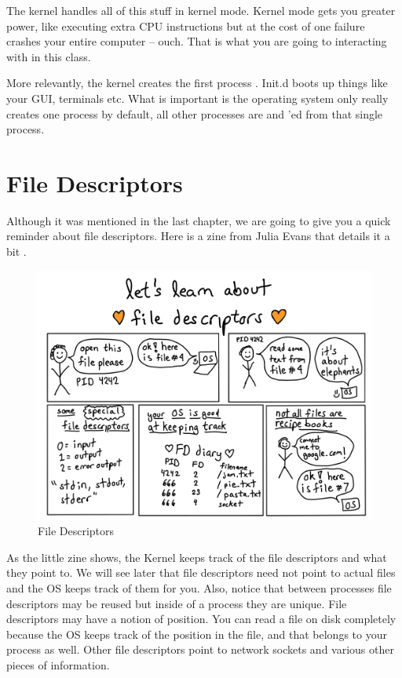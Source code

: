 The kernel handles all of this stuff in kernel mode.
Kernel mode gets you greater power, like executing extra CPU instructions but at the cost of one failure crashes your entire computer -- ouch.
That is what you are going to interacting with in this class.

More relevantly, the kernel creates the first process . Init.d boots up things like your GUI, terminals etc.
What is important is the operating system only really creates one process by default, all other processes are  and 'ed from that single process.

\section{File Descriptors}

Although it was mentioned in the last chapter, we are going to give you a quick reminder about file descriptors.
Here is a zine from Julia Evans that details it a bit \cite{evans_2018}.

\begin{figure}[htbp]
  \centering
  \includegraphics[width=.8\textwidth]{processes/images/file-descriptors.png}
  \caption{File Descriptors}
\end{figure}

As the little zine shows, the Kernel keeps track of the file descriptors and what they point to.
We will see later that file descriptors need not point to actual files and the OS keeps track of them for you.
Also, notice that between processes file descriptors may be reused but inside of a process they are unique.
File descriptors may have a notion of position.
You can read a file on disk completely because the OS keeps track of the position in the file, and that belongs to your process as well.
Other file descriptors point to network sockets and various other pieces of information.

